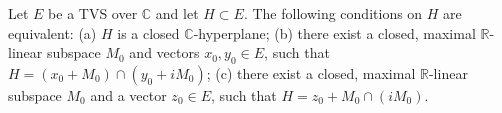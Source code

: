 Let $E$ be a TVS over $\mathbb{C}$ and let $H \subset E$. The following conditions on $H$ are equivalent:
(a) $H$ is a closed $\mathbb{C}$-hyperplane;
(b) there exist a closed, maximal $\mathbb{R}$-linear subspace $M_0$ and vectors $x_0, y_0 \in E$, such that $H = (x_0 + M_0) \cap (y_0 + iM_0)$;
(c) there exist a closed, maximal $\mathbb{R}$-linear subspace $M_0$ and a vector $z_0 \in E$, such that $H = z_0 + M_0 \cap (iM_0)$.